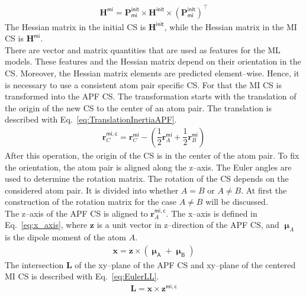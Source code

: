 	\begin{align}
		\textbf{H}^\mathsf{mi} =\textbf{P}_\mathsf{mi}^\mathsf{init} \times \textbf{H}^\mathsf{init} \times {\left(\textbf{P}_\mathsf{mi}^\mathsf{init}\right)}^\intercal
		\label{eq:rotHessian}
	\end{align}
	The Hessian matrix in the initial CS is $\textbf{H}^\mathsf{init}$,
	while the Hessian matrix in the MI CS is $\textbf{H}^\mathsf{mi}$.\\
	There are vector and matrix quantities that are used as features for the ML models.
	These features and the Hessian matrix depend on their orientation in the CS. 
	Moreover, the Hessian matrix elements are predicted element--wise. 
	Hence, it is necessary to use a consistent atom pair specific CS.
	For that the MI CS is transformed into the APF CS.
	The transformation starts with the translation of the origin of the new CS to the center of an atom pair.
	The translation is described with Eq.~\eqref{eq:TranslationInertiaAPF}.\\
	\begin{align}
		\textbf{r}^\mathsf{mi,c}_C = \textbf{r}^\mathsf{mi}_C -
		 \left(\dfrac{1}{2} \textbf{r}^\mathsf{mi}_A + 
		 \dfrac{1}{2}\textbf{r}^\mathsf{mi}_B \right) 
		\label{eq:TranslationInertiaAPF}
	\end{align}
	After this operation, the origin of the CS is in the center of the atom pair.
	To fix the orientation, the atom pair is aligned along the z--axis.
	The Euler angles are used to determine the rotation matrix.
	The rotation of the CS depends on the considered atom pair.
	It is divided into whether $A = B$ or $A \neq B$.
	At first the construction of the rotation matrix for the case $A \neq B$ will be discussed.\\
	The z--axis of the APF CS is aligned to $\textbf{r}^\mathsf{mi,c}_A$.
	The x--axis is defined in Eq.~\eqref{eq:x_axis}, where $\textbf{z}$ is a unit vector in z--direction of the APF CS,
	and $\bm{\upmu}_A$ is the dipole moment of the atom $A$.
	\begin{align}
		\textbf{x} = \textbf{z} \times ( \mathsf{\bm{\upmu}_{A}} + \mathsf{\bm{\upmu}_{B}})
		\label{eq:x_axis}
	\end{align}
	\newpage
	The intersection  $\textbf{L}$ of the xy--plane of the APF CS and xy--plane of the centered MI CS
	is described with Eq.~\eqref{eq:EulerLL}.
	\begin{align}
		\label{eq:EulerLL}
		\mathbf{L} = \mathbf{x} \times \mathbf{z}^\mathsf{mi,c}
	\end{align}
